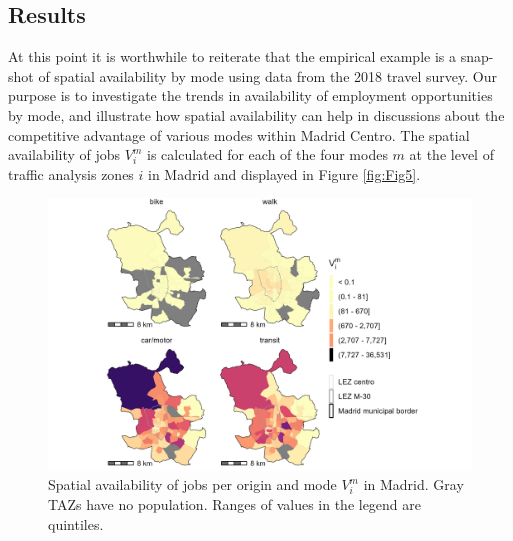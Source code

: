 \documentclass[10pt,letterpaper]{article}
\begin{document}
\hypertarget{results}{%
\subsection{Results}\label{results}}

At this point it is worthwhile to reiterate that the empirical example
is a snap-shot of spatial availability by mode using data from the 2018
travel survey. Our purpose is to investigate the trends in availability
of employment opportunities by mode, and illustrate how spatial
availability can help in discussions about the competitive advantage of
various modes within Madrid Centro. The spatial availability of jobs
\(V_i^m\) is calculated for each of the four modes \(m\) at the level of
traffic analysis zones \(i\) in Madrid and displayed in Figure
\ref{fig:Fig5}.

\begin{figure}

{\centering \includegraphics[width=0.85\linewidth]{images/SA_im_V_zn208_plot} 

}

\caption{\label{fig:Fig5} Spatial availability of jobs per origin and mode $V_i^m$ in Madrid. Gray TAZs have no population. Ranges of values in the legend are quintiles.}\label{fig:SA-m-plot}
\end{figure}
\end{document}
